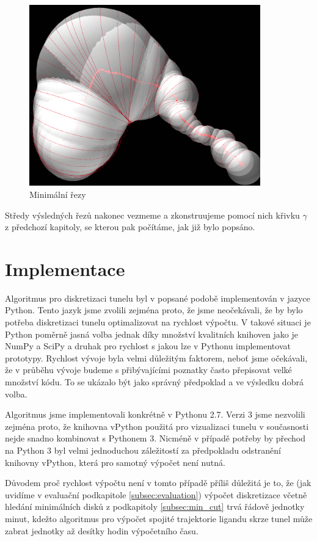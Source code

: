 \begin{figure}[ht]
    \centering
    \includegraphics[width=100mm]{img/min_cuts.png}
    \caption{Minimální řezy}
  \centering
  \label{fig:min_cuts}
\end{figure}

Středy výsledných řezů nakonec vezmeme a zkonstruujeme pomocí nich křivku
$ \gamma $ z předchozí kapitoly, se kterou pak počítáme, jak již bylo popsáno.

\section{Implementace} \label{subsec:implementation}
Algoritmus pro diskretizaci tunelu byl v popsané podobě implementován v
jazyce Python. Tento jazyk jsme zvolili zejména proto, že jsme neočekávali, že
by bylo potřeba diskretizaci tunelu optimalizovat na rychlost výpočtu. V takové
situaci je Python poměrně jasná volba jednak díky množství kvalitních
knihoven jako je NumPy a SciPy a druhak pro rychlost s jakou lze v Pythonu
implementovat prototypy. Rychlost vývoje byla velmi důležitým faktorem, neboť
jsme očekávali, že v průběhu vývoje budeme s přibývajícími poznatky často
přepisovat velké množství kódu. To se ukázalo být jako správný předpoklad
a ve výsledku dobrá volba.

Algoritmus jsme implementovali konkrétně v Pythonu 2.7. Verzi 3 jsme nezvolili
zejména proto, že knihovna vPython použitá pro vizualizaci tunelu v současnosti
nejde snadno kombinovat s Pythonem 3. Nicméně v případě potřeby by přechod na
Python 3 byl velmi jednoduchou záležitostí za předpokladu odstranění knihovny
vPython, která pro samotný výpočet není nutná.

Důvodem proč rychlost výpočtu není v tomto případě příliš důležitá je to, že
(jak uvidíme v evaluační podkapitole \ref{subsec:evaluation}) výpočet diskretizace
včetně hledání minimálních disků z podkapitoly \ref{subsec:min_cut} trvá řádově
jednotky minut, kdežto algoritmus pro výpočet spojité trajektorie ligandu skrze
tunel může zabrat jednotky až desítky hodin výpočetního času.

